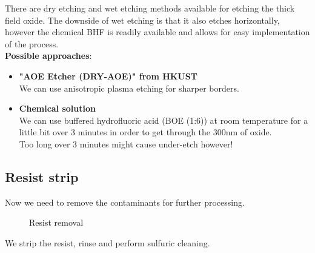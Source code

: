 There are dry etching and wet etching methods available for etching the thick field oxide.
The downside of wet etching is that it also etches horizontally, however the chemical BHF is readily available and allows for easy implementation of the process.\\

\textbf{Possible approaches}:
\begin{itemize}
	\item \textbf{"AOE Etcher (DRY-AOE)" from HKUST} \\
	We can use anisotropic plasma etching for sharper borders.
	\item \textbf{Chemical solution} \\
	We can use buffered hydrofluoric acid (BOE (1:6)) at room temperature for a little bit over 3 minutes in order to get through the 300nm of oxide.\\
	Too long over 3 minutes might cause under-etch however!
\end{itemize}

\subsection{Resist strip}
Now we need to remove the contaminants for further processing.

\begin{figure}[H]
	\centering
	\begin{tikzpicture}[node distance = 3cm, auto, thick,scale=\CrossSectionOnly, every node/.style={transform shape}]
		
	\end{tikzpicture}
	\drawStepArrow{}
	\begin{tikzpicture}[node distance = 3cm, auto, thick,scale=\CrossSectionOnly, every node/.style={transform shape}]
		
	\end{tikzpicture}
	\caption{Resist removal}
\end{figure}

We strip the resist, rinse and perform sulfuric cleaning.
